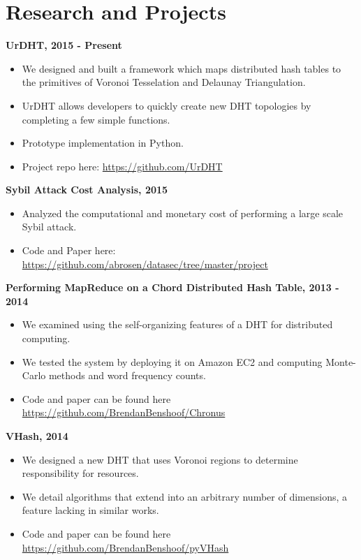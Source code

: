 \documentclass{res}
\begin{document}
\begin{resume}
\begin{enumerate}
    \end{enumerate}
    
    
  
\section{Research and Projects}

{\bf UrDHT, 2015 - Present }
\begin{itemize}
	\item We designed and built a framework which maps distributed hash tables to the primitives of Voronoi Tesselation and Delaunay Triangulation.
	\item UrDHT allows developers to quickly create new DHT topologies by completing a few simple functions. 
	\item Prototype implementation in Python.
	\item Project repo here: \url{https://github.com/UrDHT}
\end{itemize}

{\bf Sybil Attack Cost Analysis, 2015}
\begin{itemize}
	\item Analyzed the computational and monetary cost of performing a large scale Sybil attack.
	\item Code and Paper here: \url{https://github.com/abrosen/datasec/tree/master/project}
\end{itemize}



{\bf Performing MapReduce on a Chord Distributed Hash Table, 2013 - 2014}
    \begin{itemize}
    \item We examined using the self-organizing features of a DHT for distributed computing.
    \item We tested the system by deploying it on Amazon EC2 and computing Monte-Carlo methods and word frequency counts. 
    \item Code and paper can be found here \url{https://github.com/BrendanBenshoof/Chronus}
    \end{itemize}
    
{\bf VHash, 2014}
    \begin{itemize}
    \item We designed a new DHT that uses Voronoi regions to determine responsibility for resources.
    \item We detail algorithms that extend into an arbitrary number of dimensions, a feature lacking in similar works.
    \item Code and paper can be found here \url{https://github.com/BrendanBenshoof/pyVHash}
    \end{itemize}   



\end{resume}
\end{document}
